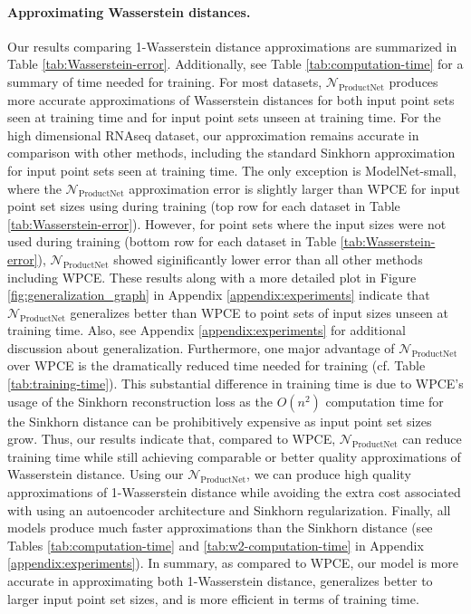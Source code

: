 \documentclass[12pt]{article}
\newcommand{\Network}{\mathcal{N}_{\mathrm{ProductNet}}}
\begin{document}
\paragraph{Approximating Wasserstein distances.}
Our results comparing 1-Wasserstein distance approximations are summarized in Table \ref{tab:Wasserstein-error}. Additionally, see Table \ref{tab:computation-time} for a summary of time needed for training. For most datasets, $\Network$ produces more accurate approximations of Wasserstein distances for both input point sets seen at training time and for input point sets unseen at training time. For the high dimensional RNAseq dataset, our approximation remains accurate in comparison with other methods, including the standard Sinkhorn approximation for input point sets seen at training time. The only exception is ModelNet-small, where the $\Network$ approximation error is slightly larger than WPCE for input point set sizes using during training (top row for each dataset in Table \ref{tab:Wasserstein-error}). However, for point sets where the input sizes were not used during training (bottom row for each dataset in Table \ref{tab:Wasserstein-error}), $\Network$ showed siginificantly lower error than all other methods including WPCE. These results along with a more detailed plot in Figure \ref{fig:generalization_graph} in Appendix \ref{appendix:experiments} indicate that $\Network$ generalizes better than WPCE to point sets of input sizes unseen at training time. Also, see Appendix \ref{appendix:experiments} for additional discussion about generalization. Furthermore, one major advantage of $\Network$ over WPCE is the dramatically reduced time needed for training (cf. Table \ref{tab:training-time}). 
This substantial difference in training time is due to WPCE's usage of the Sinkhorn reconstruction loss as the $O(n^2)$ computation time for the Sinkhorn distance can be prohibitively expensive as input point set sizes grow. 
Thus, our results indicate that, compared to WPCE, $\Network$ can reduce training time while still achieving comparable or better quality approximations of Wasserstein distance. 
Using our $\Network$, we can produce high quality approximations of 1-Wasserstein distance while avoiding the extra cost associated with using an autoencoder architecture and Sinkhorn regularization. Finally, all models produce much faster approximations than the Sinkhorn distance (see 
Tables \ref{tab:computation-time} and \ref{tab:w2-computation-time} in Appendix \ref{appendix:experiments}). In summary, as compared to WPCE, our model is more accurate in approximating both 1-Wasserstein distance, generalizes better to larger input point set sizes, and is more efficient in terms of training time.  
\end{document}
